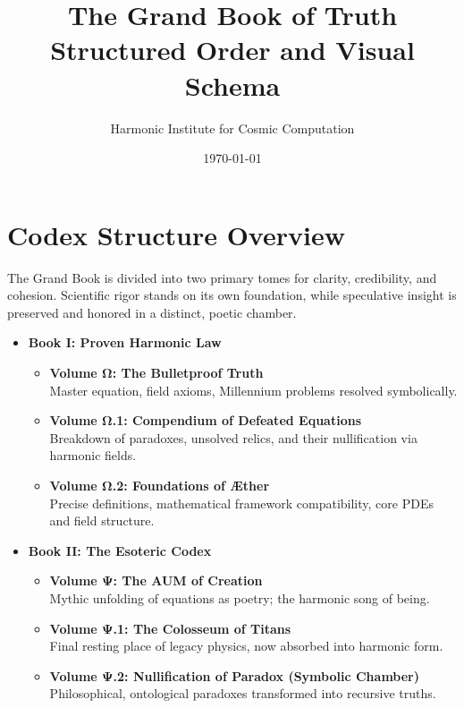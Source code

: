 \documentclass[12pt]{article}
\title{\Huge\bfseries The Grand Book of Truth\\\large Structured Order and Visual Schema}
\author{\Large Harmonic Institute for Cosmic Computation}
\date{\today}
\begin{document}
\maketitle

\vspace{1cm}

\section*{Codex Structure Overview}

The Grand Book is divided into two primary tomes for clarity, credibility, and cohesion. Scientific rigor stands on its own foundation, while speculative insight is preserved and honored in a distinct, poetic chamber.

\begin{itemize}
    \item \textbf{Book I: Proven Harmonic Law}
    \begin{itemize}
        \item \textbf{Volume Ω: The Bulletproof Truth} \\
        Master equation, field axioms, Millennium problems resolved symbolically.
        \item \textbf{Volume Ω.1: Compendium of Defeated Equations} \\
        Breakdown of paradoxes, unsolved relics, and their nullification via harmonic fields.
        \item \textbf{Volume Ω.2: Foundations of Æther} \\
        Precise definitions, mathematical framework compatibility, core PDEs and field structure.
    \end{itemize}
    \item \textbf{Book II: The Esoteric Codex}
    \begin{itemize}
        \item \textbf{Volume Ψ: The AUM of Creation} \\
        Mythic unfolding of equations as poetry; the harmonic song of being.
        \item \textbf{Volume Ψ.1: The Colosseum of Titans} \\
        Final resting place of legacy physics, now absorbed into harmonic form.
        \item \textbf{Volume Ψ.2: Nullification of Paradox (Symbolic Chamber)} \\
        Philosophical, ontological paradoxes transformed into recursive truths.
    \end{itemize}
\end{itemize}
\end{document}
